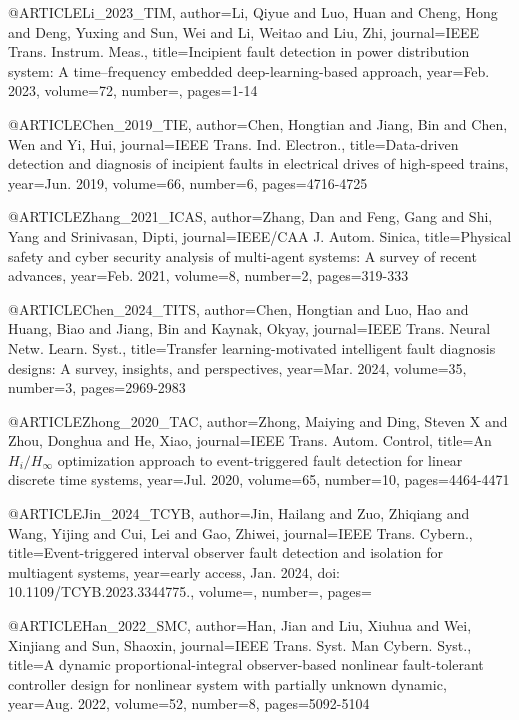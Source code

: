 


@ARTICLE{Li_2023_TIM,
  author={Li, Qiyue and Luo, Huan and Cheng, Hong and Deng, Yuxing and Sun, Wei and Li, Weitao and Liu, Zhi},
  journal={IEEE Trans. Instrum. Meas.}, 
  title={Incipient fault detection in power distribution system: A time–frequency embedded deep-learning-based approach}, 
  year={Feb. 2023},
  volume={72},
  number={},
  pages={1-14}}


@ARTICLE{Chen_2019_TIE,
  author={Chen, Hongtian and Jiang, Bin and Chen, Wen and Yi, Hui},
  journal={IEEE Trans. Ind. Electron.}, 
  title={Data-driven detection and diagnosis of incipient faults in electrical drives of high-speed trains}, 
  year={Jun. 2019},
  volume={66},
  number={6},
  pages={4716-4725}}

@ARTICLE{Zhang_2021_ICAS,
  author={Zhang, Dan and Feng, Gang and Shi, Yang and Srinivasan, Dipti},
  journal={IEEE/CAA J. Autom. Sinica}, 
  title={Physical safety and cyber security analysis of multi-agent systems: A survey of recent advances}, 
  year={Feb. 2021},
  volume={8},
  number={2},
  pages={319-333}}

@ARTICLE{Chen_2024_TITS,
  author={Chen, Hongtian and Luo, Hao and Huang, Biao and Jiang, Bin and Kaynak, Okyay},
  journal={IEEE Trans. Neural Netw. Learn. Syst.}, 
  title={Transfer learning-motivated intelligent fault diagnosis designs: A survey, insights, and perspectives}, 
  year={Mar. 2024},
  volume={35},
  number={3},
  pages={2969-2983}}


@ARTICLE{Zhong_2020_TAC,
  author={Zhong, Maiying and Ding, Steven X and Zhou, Donghua and He, Xiao},
  journal={IEEE Trans. Autom. Control}, 
  title={An ${H}_{i}/{H}_{\infty}$ optimization approach to event-triggered fault detection for linear discrete time systems}, 
  year={Jul. 2020},
  volume={65},
  number={10},
  pages={4464-4471}}


@ARTICLE{Jin_2024_TCYB,
  author={Jin, Hailang and Zuo, Zhiqiang and Wang, Yijing and Cui, Lei and Gao, Zhiwei},
  journal={IEEE Trans. Cybern.}, 
  title={Event-triggered interval observer fault detection and isolation for multiagent systems}, 
  year={early access, Jan. 2024, doi: 10.1109/TCYB.2023.3344775.},
  volume={},
  number={},
  pages={}}


@ARTICLE{Han_2022_SMC,
  author={Han, Jian and Liu, Xiuhua and Wei, Xinjiang and Sun, Shaoxin},
  journal={IEEE Trans. Syst. Man Cybern. Syst.}, 
  title={A dynamic proportional-integral observer-based nonlinear fault-tolerant controller design for nonlinear system with partially unknown dynamic}, 
  year={Aug. 2022},
  volume={52},
  number={8},
  pages={5092-5104}}


